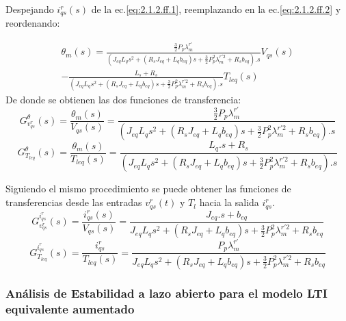 \documentclass[10pt]{article}
\begin{document}
\begin{enumerate}
Despejando $i^{r}_{qs}(s)$ de la ec.\ref{eq:2.1.2.ff.1}, reemplazando en la ec.\ref{eq:2.1.2.ff.2} y reordenando:

\begin{eqnarray}
	\theta_{m}(s)=\frac{\frac{3}{2}P_{p}\lambda^{r'}_{m}}{(J_{eq}L_{q}s^{2}+(R_{s}J_{eq}+L_{q}b_{eq})s + \frac{3}{2}P_{p}^{2}\lambda ^{r'2}_{m}+R_{s}b_{eq}).s} V_{qs}(s) \nonumber\\
	- \frac{L_{s}+R_{s}}{(J_{eq}L_{q}s^{2}+(R_{s}J_{eq}+L_{q}b_{eq})s + \frac{3}{2}P_{p}^{2}\lambda ^{r'2}_{m}+R_{s}b_{eq}).s} T_{leq}(s)
	\label{eq:2.1.2.ff.3}
	\end{eqnarray}
De donde se obtienen las dos funciones de transferencia:
\begin{equation}
	G^{\theta}_{v^{r}_{qs}}(s)=\frac{\theta_{m}(s)}{V_{qs}(s)}=\frac{\frac{3}{2}P_{p}\lambda^{r'}_{m}}{(J_{eq}L_{q}s^{2}+(R_{s}J_{eq}+L_{q}b_{eq})s + \frac{3}{2}P_{p}^{2}\lambda ^{r'2}_{m}+R_{s}b_{eq}).s}
	\label{eq:2.1.2.ff.4}
	\end{equation}
	\begin{equation}
	G^{\theta}_{T_{leq}}(s)=\frac{\theta_{m}(s)}{T_{leq}(s)}=\frac{L_{q}.s+R_{s}}{(J_{eq}L_{q}s^{2}+(R_{s}J_{eq}+L_{q}b_{eq})s + \frac{3}{2}P_{p}^{2}\lambda ^{r'2}_{m}+R_{s}b_{eq}).s}
	\label{eq:2.1.2.ff.5}
	\end{equation} 


Siguiendo el mismo procedimiento se puede obtener las funciones de transferencias desde las entradas $v^{r}_{qs}(t)$ y $T_{l}$ hacia la salida $i^{r}_{qs}$.\\
\begin{equation}
	G^{i^{r}_{qs}}_{v^{r}_{qs}}(s)=\frac{i^{r}_{qs}(s)}{V_{qs}(s)}=\frac{J_{eq}.s+b_{eq}}{J_{eq}L_{q}s^{2}+(R_{s}J_{eq}+L_{q}b_{eq})s + \frac{3}{2}P_{p}^{2}\lambda ^{r'2}_{m}+R_{s}b_{eq}}
	\label{eq:2.1.2.ff.6}
	\end{equation}
	\begin{equation}
	G^{i^{r}_{qs}}_{T_{leq}}(s)=\frac{i^{r}_{qs}}{T_{leq}(s)}=\frac{P_{p}\lambda^{r'}_{m}}{J_{eq}L_{q}s^{2}+(R_{s}J_{eq}+L_{q}b_{eq})s + \frac{3}{2}P_{p}^{2}\lambda ^{r'2}_{m}+R_{s}b_{eq}}
	\label{eq:2.1.2.ff.7}
	\end{equation} 
\end{enumerate}

\subsubsection{Análisis de Estabilidad a lazo abierto para el modelo LTI equivalente aumentado}
\end{document}
